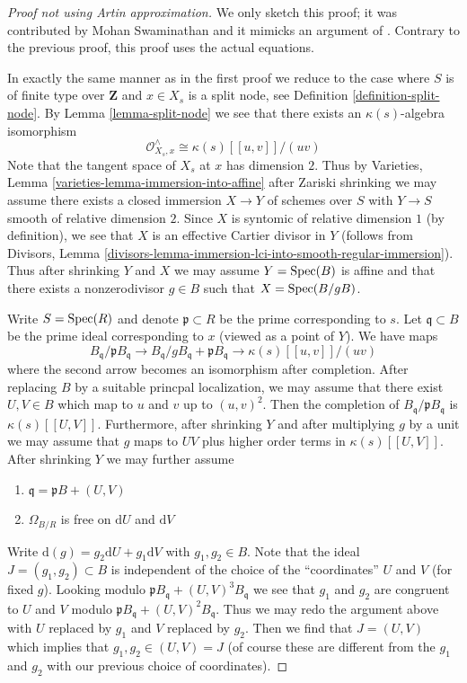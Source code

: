 \begin{proof}[Proof not using Artin approximation]
We only sketch this proof; it was contributed by Mohan Swaminathan
and it mimicks an argument of \cite[Proposition X.2.1]{ACG}. Contrary
to the previous proof, this proof uses the actual equations.

\medskip\noindent
In exactly the same manner as in the first proof we reduce to the
case where $S$ is of finite type over $\mathbf{Z}$ and $x \in X_s$
is a split node, see Definition \ref{definition-split-node}.
By Lemma \ref{lemma-split-node} we see that there exists an
$\kappa(s)$-algebra isomorphism
$$
\mathcal{O}_{X_s, x}^\wedge \cong \kappa(s)[[u, v]]/(uv)
$$
Note that the tangent space of $X_s$ at $x$ has dimension $2$.
Thus by Varieties, Lemma \ref{varieties-lemma-immersion-into-affine}
after Zariski shrinking we may assume there exists a closed immersion
$X \to Y$ of schemes over $S$ with $Y \to S$ smooth of relative dimension $2$.
Since $X$ is syntomic of relative dimension $1$ (by definition), we see
that $X$ is an effective Cartier divisor in $Y$ (follows from
Divisors, Lemma
\ref{divisors-lemma-immersion-lci-into-smooth-regular-immersion}).
Thus after shrinking $Y$ and $X$ we may assume $Y = \mathop{\mathrm{Spec}}(B)$
is affine and that there exists a nonzerodivisor $g \in B$ such
that $X = \mathop{\mathrm{Spec}}(B/gB)$.

\medskip\noindent
Write $S = \mathop{\mathrm{Spec}}(R)$ and denote $\mathfrak p \subset R$ be the prime
corresponding to $s$. Let $\mathfrak q \subset B$ be the prime ideal
corresponding to $x$ (viewed as a point of $Y$). We have maps
$$
B_\mathfrak q / \mathfrak p B_\mathfrak q
\longrightarrow
B_\mathfrak q / g B_\mathfrak q + \mathfrak p B_\mathfrak q
\longrightarrow
\kappa(s)[[u, v]]/(uv)
$$
where the second arrow becomes an isomorphism after completion.
After replacing $B$ by a suitable princpal localization,
we may assume that there exist $U, V \in B$ which map to
$u$ and $v$ up to $(u, v)^2$. Then the completion of
$B_\mathfrak q/\mathfrak p B_\mathfrak q$
is $\kappa(s)[[U, V]]$. Furthermore, after
shrinking $Y$ and after multiplying $g$ by a unit we may
assume that $g$ maps to $UV$ plus higher order terms in
$\kappa(s)[[U, V]]$. After shrinking $Y$ we may further assume
\begin{enumerate}
\item $\mathfrak q = \mathfrak pB + (U, V)$
\item $\Omega_{B/R}$ is free on $\text{d}U$ and $\text{d}V$
\end{enumerate}
Write $\text{d}(g) = g_2 \text{d}U + g_1 \text{d}V$ with $g_1, g_2 \in B$.
Note that the ideal $J = (g_1, g_2) \subset B$ is independent of the
choice of the ``coordinates'' $U$ and $V$ (for fixed $g$).
Looking modulo $\mathfrak p B_\mathfrak q + (U, V)^3B_\mathfrak q$
we see that $g_1$ and $g_2$ are congruent to $U$ and $V$ modulo
$\mathfrak p B_\mathfrak q + (U, V)^2B_\mathfrak q$.
Thus we may redo the argument above with $U$ replaced by $g_1$
and $V$ replaced by $g_2$. Then we find that $J = (U, V)$
which implies that $g_1, g_2 \in (U, V) = J$ (of course these
are different from the $g_1$ and $g_2$ with our previous choice
of coordinates).


\end{proof}

